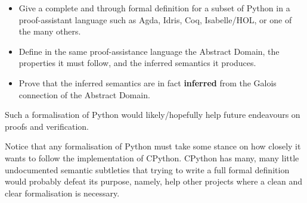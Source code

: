 \begin{itemize}
\tightlist
\item
  Give a complete and through formal definition for a subset of Python
  in a proof-assistant language such as Agda, Idris, Coq, Isabelle/HOL,
  or one of the many others.
\item
  Define in the same proof-assistance language the Abstract Domain, the
  properties it must follow, and the inferred semantics it produces.
\item
  Prove that the inferred semantics are in fact \textbf{inferred} from
  the Galois connection of the Abstract Domain.
\end{itemize}

Such a formalisation of Python would likely/hopefully help future
endeavours on proofs and verification.

Notice that any formalisation of Python must take some stance on how
closely it wants to follow the implementation of CPython. CPython has
many, many little undocumented semantic subtleties that trying to write
a full formal definition would probably defeat its purpose, namely, help
other projects where a clean and clear formalisation is necessary.

{}
